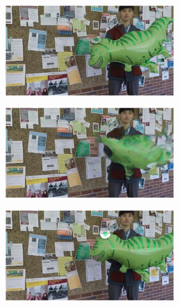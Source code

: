 \documentclass{article}
\begin{document}
\begin{figure}[h]
\centering
\begin{subfigure}{0.2\textwidth}
	\centering
    \includegraphics[width=1\linewidth]{nd_scene/Balloon1_I0.jpg}
\end{subfigure}%
\begin{subfigure}{0.2\textwidth}
	\centering
    \includegraphics[width=1\linewidth]{nd_scene/Balloon1_out.jpg}
\end{subfigure}%
\begin{subfigure}{0.2\textwidth}
	\centering
    \includegraphics[width=1\linewidth]{nd_scene/Balloon1_GT.jpg}

\end{subfigure}
\end{figure}
\end{document}
